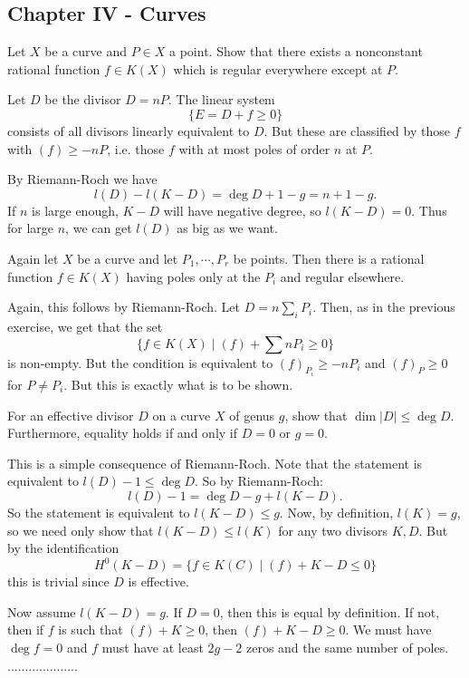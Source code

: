 \documentclass[11pt, english]{article}
\begin{document}
\subsection{Chapter IV - Curves}

\begin{exc}[Exercise 1.1]
Let $X$ be a curve and $P \in X$ a point. Show that there exists a nonconstant rational function $f \in K(X)$ which is regular everywhere except at $P$.
\end{exc}
\begin{sol}
Let $D$ be the divisor $D=nP$. The linear system 
$$
\{ E = D + f \geq 0 \}
$$
consists of all divisors linearly equivalent to $D$. But these are classified by those $f$ with $(f) \geq -nP$, i.e. those $f$ with at most poles of order $n$ at $P$.

By Riemann-Roch we have
$$
l(D)-l(K-D) = \deg D +1 -g = n+1-g.
$$
If $n$ is large enough, $K-D$ will have negative degree, so $l(K-D)=0$. Thus for large $n$, we can get $l(D)$ as big as we want.
\end{sol}

\begin{exc}[Exercise 1.2]
Again let $X$ be a curve and let $P_1,\cdots,P_r$ be points. Then there is a rational function $f \in K(X)$ having poles only at the $P_i$ and regular elsewhere.
\end{exc}
\begin{exc}
Again, this follows by Riemann-Roch. Let $D=n\sum_i P_i$. Then, as in the previous exercise, we get that the set
$$
\{ f \in K(X) \mid (f) + \sum nP_i \geq 0 \}
$$
is non-empty. But the condition is equivalent to $(f)_{P_i} \geq -nP_i$ and $(f)_P \geq 0$ for $P \neq P_i$. But this is exactly what is to be shown.
\end{exc}


\begin{exc}[Exercise 1.5]
For an effective divisor $D$ on a curve $X$ of genus $g$, show that $\dim \lvert D \rvert \leq \deg D$. Furthermore, equality holds if and only if $D=0$ or $g=0$. 
\end{exc}
\begin{sol}
This is a simple consequence of Riemann-Roch. Note that the statement is equivalent to $l(D) - 1 \leq \deg D$. So by Riemann-Roch:
\[
l(D)-1 = \deg D - g + l(K-D).
\]
So the statement is equivalent to $l(K-D) \leq g$. Now, by definition, $l(K)=g$, so we need only show that $l(K-D) \leq l(K)$ for any two divisors $K,D$. But by the identification
$$
H^0(K-D)=\{ f \in K(C) \mid (f) + K-D \leq 0 \}
$$
this is trivial since $D$ is effective.

Now assume $l(K-D)=g$. If $D=0$, then this is equal by definition. If not, then if $f$ is such that $(f) + K \geq 0$, then $(f) + K-D \geq 0$. We must have $\deg f = 0$ and $f$ must have at least $2g-2$ zeros and the same number of poles. ....................
\end{sol}
\end{document}
